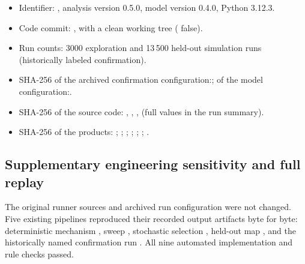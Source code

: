 \begin{itemize}
  \raggedright
  \item Identifier: \code{\RunID}, analysis version 0.5.0, model version 0.4.0, Python 3.12.3.
  \item Code commit: , with a clean working tree ( false).
  \item Run counts: 3000 exploration and 13\,500 held-out simulation runs (historically labeled confirmation).
  \item SHA-256 of the archived confirmation configuration:\newline{}; of the model configuration:\newline{}.
  \item SHA-256 of the source code:  ,  ,  ,   (full values in the run summary).
  \item SHA-256 of the products:  ;  ;  ;  ;\newline{} ;\newline{} ;  .
\end{itemize}

\subsection*{Supplementary engineering sensitivity and full replay}

The original runner sources and archived run configuration were not changed. Five existing pipelines reproduced their recorded output artifacts byte for byte: deterministic mechanism , sweep , stochastic selection , held-out map , and the historically named confirmation run . All nine automated implementation and rule checks passed.

